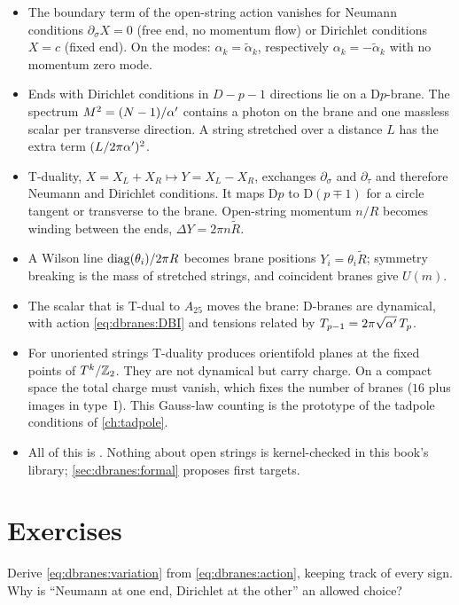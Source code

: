 \begin{summarybox}
\begin{itemize}[leftmargin=*]
\item The boundary term of the open-string action vanishes for Neumann conditions
 $\partial_\sigma X=0$ (free end, no momentum flow) or Dirichlet conditions $X=c$ (fixed end). On
 the modes: $\alpha_k=\tilde\alpha_k$, respectively $\alpha_k=-\tilde\alpha_k$ with no momentum zero mode.
\item Ends with Dirichlet conditions in $D-p-1$ directions lie on a D$p$-brane. The spectrum
 $M^2=(N-1)/\alpha'$ contains a photon on the brane and one massless scalar per transverse
 direction. A string stretched over a distance $L$ has the extra term $(L/2\pi\alpha')^2$.
\item T-duality, $X=X_L+X_R\mapsto Y=X_L-X_R$, exchanges $\partial_\sigma$ and $\partial_\tau$ and
 therefore Neumann and Dirichlet conditions. It maps D$p$ to D$(p\mp1)$ for a circle tangent
 or transverse to the brane. Open-string momentum $n/R$ becomes winding between the ends,
 $\Delta Y=2\pi n\tilde R$.
\item A Wilson line $\operatorname{diag}(\theta_i)/2\pi R$ becomes brane positions $Y_i=\theta_i\tilde R$;
 symmetry breaking is the mass of stretched strings, and coincident branes give $U(m)$.
\item The scalar that is T-dual to $A_{25}$ moves the brane: D-branes are dynamical, with action
 \eqref{eq:dbranes:DBI} and tensions related by $T_{p-1}=2\pi\sqrt{\alpha'}\,T_p$.
\item For unoriented strings T-duality produces orientifold planes at the fixed points of
 $T^k/\mathbb{Z}_2$. They are not dynamical but carry charge. On a compact space the total charge must
 vanish, which fixes the number of branes ($16$ plus images in type~I). This Gauss-law counting is
 the prototype of the tadpole conditions of \cref{ch:tadpole}.
\item All of this is \TL. Nothing about open strings is kernel-checked in this book's library;
 \cref{sec:dbranes:formal} proposes first targets.
\end{itemize}
\end{summarybox}

\section*{Exercises}

\begin{exercise}[$\star$]\label{ex:dbranes:first}
Derive \eqref{eq:dbranes:variation} from \eqref{eq:dbranes:action}, keeping track of every sign.
Why is ``Neumann at one end, Dirichlet at the other'' an allowed choice?
\end{exercise}

